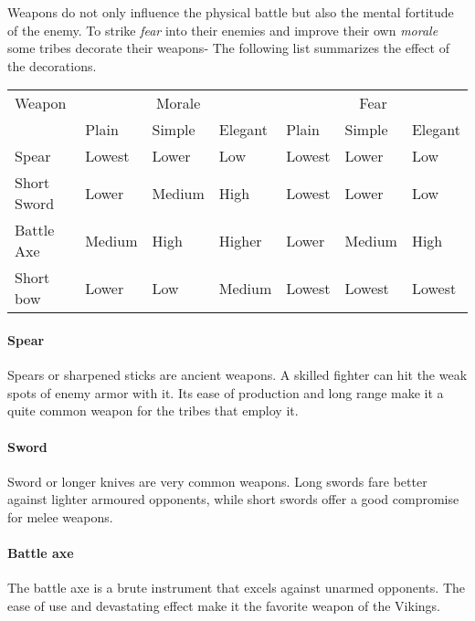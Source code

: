 Weapons do not only influence the physical battle but also the mental fortitude
of the enemy. To strike \emph{fear} into their enemies and improve their own
\emph{morale} some tribes decorate their weapons- The following list summarizes
the effect of the decorations.

\begin{longtable}{l ll ll ll}
	\toprule
	Weapon
	 & \multicolumn{3}{c}{Morale}
	 & \multicolumn{3}{c}{Fear}
	\\
	 & Plain                      & Simple & Elegant
	 & Plain                      & Simple & Elegant \\
	\midrule
	Spear
	 & Lowest                     & Lower  & Low
	 & Lowest                     & Lower  & Low     \\
	Short Sword
	 & Lower                      & Medium & High
	 & Lowest                     & Lower  & Low     \\
	Battle Axe
	 & Medium                     & High   & Higher
	 & Lower                      & Medium & High    \\
	Short bow
	 & Lower                      & Low    & Medium
	 & Lowest                     & Lowest & Lowest  \\
	\bottomrule
\end{longtable}

\paragraph{Spear}

Spears or sharpened sticks are ancient weapons. A skilled fighter can hit the
weak spots of enemy armor with it. Its ease of production and long range make
it a quite common weapon for the tribes that employ it.

\paragraph{Sword}

Sword or longer knives are very common weapons. Long swords fare better against
lighter armoured opponents, while short swords offer a good compromise for
melee weapons.

\paragraph{Battle axe}

The battle axe is a brute instrument that excels against unarmed opponents. The
ease of use and devastating effect make it the favorite weapon of the
\gls{Vikings}.

